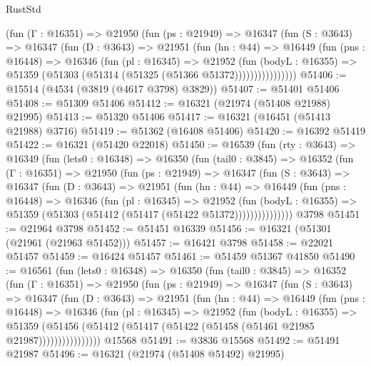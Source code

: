 \begin{lexlean}{RustStd}
\begin{coremodule}
            (fun (Γ : @16351) =>
            @21950
              (fun (ps : @21949) =>
              @16347
                (fun (S : @3643) =>
                @16347
                  (fun (D : @3643) =>
                  @21951
                    (fun (hn : @44) =>
                    @16449
                      (fun (pns : @16448) =>
                      @16346
                        (fun (pl : @16345) =>
                        @21952
                          (fun (bodyL : @16355) =>
                          @51359 (@51303 (@51314 (@51325 (@51366 @51372))))))))))))))))
@51406 := @15514 (@4534 (@3819 (@4617 @3798) @3829))
@51407 := @51401 @51406
@51408 := @51309 @51406
@51412 := @16321 (@21974 (@51408 @21988) @21995)
@51413 := @51320 @51406
@51417 := @16321 (@16451 (@51413 @21988) @3716)
@51419 := @51362 (@16408 @51406)
@51420 := @16392 @51419
@51422 := @16321 (@51420 @22018)
@51450 := @16539
    (fun (rty : @3643) =>
    @16349
      (fun (lets0 : @16348) =>
      @16350
        (fun (tail0 : @3845) =>
        @16352
          (fun (Γ : @16351) =>
          @21950
            (fun (ps : @21949) =>
            @16347
              (fun (S : @3643) =>
              @16347
                (fun (D : @3643) =>
                @21951
                  (fun (hn : @44) =>
                  @16449
                    (fun (pns : @16448) =>
                    @16346
                      (fun (pl : @16345) =>
                      @21952
                        (fun (bodyL : @16355) =>
                        @51359 (@51303 (@51412 (@51417 (@51422 @51372)))))))))))))))
    @3798
@51451 := @21964 @3798
@51452 := @51451 @16339
@51456 := @16321 (@51301 (@21961 (@21963 @51452)))
@51457 := @16421 @3798
@51458 := @22021 @51457
@51459 := @16424 @51457
@51461 := @51459 @51367 @41850
@51490 := @16561
    (fun (lets0 : @16348) =>
    @16350
      (fun (tail0 : @3845) =>
      @16352
        (fun (Γ : @16351) =>
        @21950
          (fun (ps : @21949) =>
          @16347
            (fun (S : @3643) =>
            @16347
              (fun (D : @3643) =>
              @21951
                (fun (hn : @44) =>
                @16449
                  (fun (pns : @16448) =>
                  @16346
                    (fun (pl : @16345) =>
                    @21952
                      (fun (bodyL : @16355) =>
                      @51359
                        (@51456
                          (@51412 (@51417 (@51422 (@51458 (@51461 @21985 @21987))))))))))))))))
    @15568
@51491 := @3836 @15568
@51492 := @51491 @21987
@51496 := @16321 (@21974 (@51408 @51492) @21995)

\end{coremodule}
\end{lexlean}
